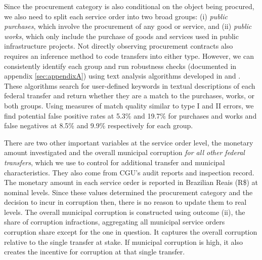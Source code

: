 \documentclass[11pt]{article}
\begin{document}
Since the procurement category is also conditional on the object being procured, we also need to split each service order into two broad groups: (i) \emph{public purchases}, which involve the procurement of any good or service, and (ii) \emph{public works}, which only include the purchase of goods and services used in public infrastructure projects. Not directly observing procurement contracts also requires an inference method to code transfers into either type. However, we can consistently identify each group and run robustness checks (documented in appendix \ref{sec:appendixA}) using text analysis algorithms developed in \citet{GrimmerTextDataPromise2013a} and \citet{AssumpcaotextfindDataDrivenText2018}. These algorithms search for user-defined keywords in textual descriptions of each federal transfer and return whether they are a match to the purchases, works, or both groups. Using measures of match quality similar to type I and II errors, we find potential false positive rates at 5.3\% and 19.7\% for purchases and works and false negatives at 8.5\% and 9.9\% respectively for each group.

There are two other important variables at the service order level, the monetary amount investigated and the overall municipal corruption \emph{for all other federal transfers}, which we use to control for additional transfer and municipal characteristics. They also come from CGU's audit reports and inspection record. The monetary amount in each service order is reported in Brazilian Reais (R\$) at nominal levels. Since these values determined the procurement category and the decision to incur in corruption then, there is no reason to update them to real levels. The overall municipal corruption is constructed using outcome (ii), the share of corruption infractions, aggregating all municipal service orders corruption share except for the one in question. It captures the overall corruption relative to the single transfer at stake. If municipal corruption is high, it also creates the incentive for corruption at that single transfer.
\end{document}
